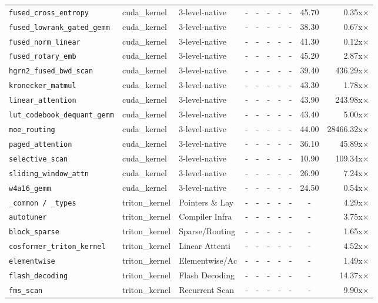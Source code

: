 \begin{center}
\begin{longtable}{lllccccccr}
\texttt{fused\_cross\_entropy} & cuda\_kernel & 3-level-native & - & - & - & - & - & 45.70 & 0.35x$\times$ \\
\texttt{fused\_lowrank\_gated\_gemm} & cuda\_kernel & 3-level-native & - & - & - & - & - & 38.30 & 0.67x$\times$ \\
\texttt{fused\_norm\_linear} & cuda\_kernel & 3-level-native & - & - & - & - & - & 41.30 & 0.12x$\times$ \\
\texttt{fused\_rotary\_emb} & cuda\_kernel & 3-level-native & - & - & - & - & - & 45.20 & 2.87x$\times$ \\
\texttt{hgrn2\_fused\_bwd\_scan} & cuda\_kernel & 3-level-native & - & - & - & - & - & 39.40 & 436.29x$\times$ \\
\texttt{kronecker\_matmul} & cuda\_kernel & 3-level-native & - & - & - & - & - & 43.30 & 1.78x$\times$ \\
\texttt{linear\_attention} & cuda\_kernel & 3-level-native & - & - & - & - & - & 43.90 & 243.98x$\times$ \\
\texttt{lut\_codebook\_dequant\_gemm} & cuda\_kernel & 3-level-native & - & - & - & - & - & 43.40 & 5.00x$\times$ \\
\texttt{moe\_routing} & cuda\_kernel & 3-level-native & - & - & - & - & - & 44.00 & 28466.32x$\times$ \\
\texttt{paged\_attention} & cuda\_kernel & 3-level-native & - & - & - & - & - & 36.10 & 45.89x$\times$ \\
\texttt{selective\_scan} & cuda\_kernel & 3-level-native & - & - & - & - & - & 10.90 & 109.34x$\times$ \\
\texttt{sliding\_window\_attn} & cuda\_kernel & 3-level-native & - & - & - & - & - & 26.90 & 7.24x$\times$ \\
\texttt{w4a16\_gemm} & cuda\_kernel & 3-level-native & - & - & - & - & - & 24.50 & 0.54x$\times$ \\
\texttt{\_common / \_types} & triton\_kernel & Pointers \& Lay & - & - & - & - & - & - & 4.29x$\times$ \\
\texttt{autotuner} & triton\_kernel & Compiler Infra & - & - & - & - & - & - & 3.75x$\times$ \\
\texttt{block\_sparse} & triton\_kernel & Sparse/Routing & - & - & - & - & - & - & 1.65x$\times$ \\
\texttt{cosformer\_triton\_kernel} & triton\_kernel & Linear Attenti & - & - & - & - & - & - & 4.52x$\times$ \\
\texttt{elementwise} & triton\_kernel & Elementwise/Ac & - & - & - & - & - & - & 1.49x$\times$ \\
\texttt{flash\_decoding} & triton\_kernel & Flash Decoding & - & - & - & - & - & - & 14.37x$\times$ \\
\texttt{fms\_scan} & triton\_kernel & Recurrent Scan & - & - & - & - & - & - & 9.90x$\times$ \\
\end{longtable}
\end{center}
